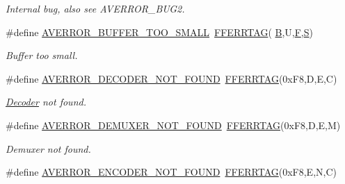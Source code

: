 \begin{DoxyCompactItemize}
\begin{DoxyCompactList}\small\item\em Internal bug, also see A\+V\+E\+R\+R\+O\+R\+\_\+\+B\+U\+G2. \end{DoxyCompactList}\item 
\#define \hyperlink{group__lavu__error_ga76077a6d42ee211f59712485bd977e40}{A\+V\+E\+R\+R\+O\+R\+\_\+\+B\+U\+F\+F\+E\+R\+\_\+\+T\+O\+O\+\_\+\+S\+M\+A\+LL}~\hyperlink{group__lavu__error_gacfc46235e91e0770b94f7918013a1034}{F\+F\+E\+R\+R\+T\+AG}( \textquotesingle{}\hyperlink{libnyquist_2nyquist_2nyqsrc_2add_8c_a111da81ae5883147168bbb8366377b10}{B}\textquotesingle{},\textquotesingle{}U\textquotesingle{},\textquotesingle{}\hyperlink{xlftab_8c_a42257a545daf5b7933d6e8f96adc74f2}{F}\textquotesingle{},\textquotesingle{}\hyperlink{xlftab_8c_af933676109efed7ab34cea71d748a517}{S}\textquotesingle{})
\begin{DoxyCompactList}\small\item\em Buffer too small. \end{DoxyCompactList}\item 
\#define \hyperlink{group__lavu__error_ga28f845c3efcf791fdf3b2b3907330bf5}{A\+V\+E\+R\+R\+O\+R\+\_\+\+D\+E\+C\+O\+D\+E\+R\+\_\+\+N\+O\+T\+\_\+\+F\+O\+U\+ND}~\hyperlink{group__lavu__error_gacfc46235e91e0770b94f7918013a1034}{F\+F\+E\+R\+R\+T\+AG}(0x\+F8,\textquotesingle{}\+D\textquotesingle{},\textquotesingle{}\+E\textquotesingle{},\textquotesingle{}\+C\textquotesingle{})
\begin{DoxyCompactList}\small\item\em \hyperlink{class_decoder}{Decoder} not found. \end{DoxyCompactList}\item 
\#define \hyperlink{group__lavu__error_gaf7cbadf2ff7121084d2cde763f4e06b9}{A\+V\+E\+R\+R\+O\+R\+\_\+\+D\+E\+M\+U\+X\+E\+R\+\_\+\+N\+O\+T\+\_\+\+F\+O\+U\+ND}~\hyperlink{group__lavu__error_gacfc46235e91e0770b94f7918013a1034}{F\+F\+E\+R\+R\+T\+AG}(0x\+F8,\textquotesingle{}\+D\textquotesingle{},\textquotesingle{}\+E\textquotesingle{},\textquotesingle{}\+M\textquotesingle{})
\begin{DoxyCompactList}\small\item\em Demuxer not found. \end{DoxyCompactList}\item 
\#define \hyperlink{group__lavu__error_ga3fad023a4fafed6b6ec9148606a61979}{A\+V\+E\+R\+R\+O\+R\+\_\+\+E\+N\+C\+O\+D\+E\+R\+\_\+\+N\+O\+T\+\_\+\+F\+O\+U\+ND}~\hyperlink{group__lavu__error_gacfc46235e91e0770b94f7918013a1034}{F\+F\+E\+R\+R\+T\+AG}(0x\+F8,\textquotesingle{}\+E\textquotesingle{},\textquotesingle{}\+N\textquotesingle{},\textquotesingle{}\+C\textquotesingle{})

\end{DoxyCompactItemize}
